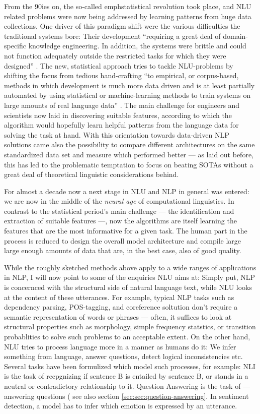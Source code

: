 From the 90ies on, the so-called emph{statistical revolution} took place, and NLU related
problems were now being addressed by learning patterns from huge data collections. One driver
of this paradigm shift were the various difficulties the traditional systems bore: Their
development ``requiring a great deal of domain-specific knowledge engineering. In addition,
the systems were brittle and could not function adequately outside the restricted tasks for
which they were designed'' \citep[p.~13]{brill1997overview}. The new, statistical {\color{red}
approach} tries to tackle NLU-problems by shifting the focus from tedious hand-crafting ``to
empirical, or corpus-based, methods in which development is much more data driven and is at
least partially automated by using statistical or machine-learning methods to train systems
on large amounts of real language data'' \citep[p.~13]{brill1997overview}. The main challenge
for engineers and scientists now laid in discovering suitable features, according to which the
algorithm would hopefully learn helpful patterns from the language data for solving the task
at hand. With this orientation towards data-driven NLP solutions came also the possibility to
compare different architectures on the same standardized data set and measure which performed
better --- as laid out before, this has led to the problematic temptation to focus on beating
SOTAs without a great deal of theoretical linguistic considerations behind.

For almost a decade now a next stage in NLU and NLP in general was entered: we are now in the
middle of the \emph{neural age} of computational linguistics. In contrast to the statistical
period's main challenge --- the identification and extraction of suitable features ---, now the
algorithms are itself learning the features that are the most informative for a given task. The
human part in the process is reduced to design the overall model architecture and compile large
large enough amounts of data that are, in the best case, also of good quality.

While the roughly sketched methods above apply to a wide ranges of applications in NLP, I will now
point to some of the enquiries NLU aims at: Simply put, NLP is concernced with the structural side
of natural language text, while NLU looks at the content of these utterances. For example, typical
NLP tasks such as dependency parsing, POS-tagging, and coreference soltution don't require a
semantic representation of words or phrases --- often, it suffices to look at structural properties
such as morphology, simple frequency statstics, or transition probablities to solve such problems
to an acceptable extent. On the other hand, NLU tries to process language more in a manner as
humans do it: We infer something from language, answer questions, detect logical inconsistencies
etc. Several tasks have been formulized which model such processes, for example: NLI is the task
of recpgnizing if sentence B is entailed by sentence B, or stands in a neutral or contradictory
relationship to it. Question Answering is the task of --- answering questions ( see also section
\ref{sec:sec:question-answering}. In sentiment detection, a model has to infer which emotion is
expressed by an utterance.

